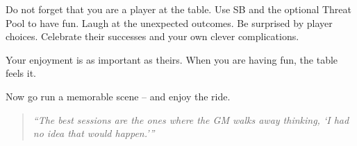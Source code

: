 Do not forget that you are a player at the table. Use SB and the optional Threat Pool to have fun. Laugh at the unexpected outcomes. Be surprised by player choices. Celebrate their successes and your own clever complications.

Your enjoyment is as important as theirs. When you are having fun, the table feels it.

Now go run a memorable scene – and enjoy the ride.

\begin{quote}
\emph{“The best sessions are the ones where the GM walks away thinking, ‘I had no idea that would happen.’”}
\end{quote}